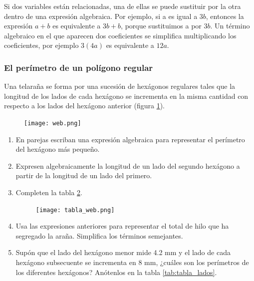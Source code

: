 \documentclass[11pt]{book}
\begin{document}
\begin{enumerate}
        \begin{boxH}
          Si dos variables están relacionadas, una de ellas se puede sustituir por la otra dentro
          de una expresión algebraica. Por ejemplo, si a es igual a $3b$, entonces la expresión
          $a + b$ es equivalente a $3b + b$, porque sustituimos a por $3b$.
          Un término algebraico en el que aparecen dos coeficientes se simplifica multiplicando
          los coeficientes, por ejemplo $3(4a)$ es equivalente a $12a$.
        \end{boxH}

        \subsubsection{El perímetro de un polígono regular}
        Una telaraña se forma por una sucesión de hexágonos regulares tales que la longitud de los
        lados de cada hexágono se incrementa en la misma cantidad con respecto a los lados del
        hexágono anterior (figura \ref{fig:web}).
        \begin{figure}[H]
          \centering
          \texttt{[image: web.png]}
          \label{fig:web}
        \end{figure}
        \begin{enumerate}
          \item En parejas escriban una expresión algebraica para representar
                el perímetro del hexágono más pequeño.
          \item Expresen algebraicamente la longitud de un lado del segundo
                hexágono a partir de la longitud de un lado del primero.
          \item Completen la tabla \ref{tab:tabla_web}.
                \begin{figure}[H]
                  \centering
                  \texttt{[image: tabla\_web.png]}
                  \label{tab:tabla_web}
                \end{figure}
          \item Usa las expresiones anteriores para representar el total de hilo que ha segregado
                la araña. Simplifica los términos semejantes.
          \item Supón que el lado del hexágono menor mide 4.2 mm y el lado de cada hexágono
                subsecuente se incrementa en 8 mm, ¿cuáles son los perímetros de los diferentes
                hexágonos? Anótenlos en la tabla \ref{tab:tabla_lados}.

\end{enumerate}
\end{enumerate}
\end{document}
